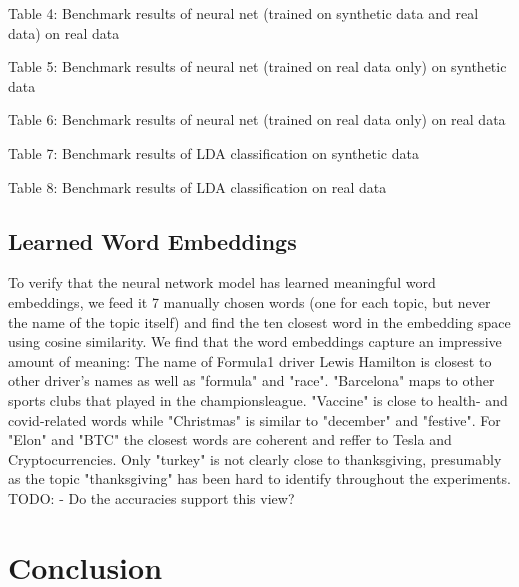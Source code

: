 \documentclass[11pt]{article}
\begin{document}
\begin{center}

\end{center}
Table 4: Benchmark results of neural net (trained on synthetic data and real data) on real data

\begin{center}

\end{center}
Table 5: Benchmark results of neural net (trained on real data only) on synthetic data


\begin{center}

\end{center}
Table 6: Benchmark results of neural net (trained on real data only) on real data


\begin{center}

\end{center}
Table 7: Benchmark results of LDA classification on synthetic data

\begin{center}

\end{center}
Table 8: Benchmark results of LDA classification on real data


\subsection{Learned Word Embeddings}
To verify that the neural network model has learned meaningful word embeddings, we feed it 7 manually chosen words (one for each topic, but never the name of the topic itself) and find the ten closest word in the embedding space using cosine similarity. We find that the word embeddings capture an impressive amount of meaning: The name of Formula1 driver Lewis Hamilton is closest to other driver's names as well as "formula" and "race". "Barcelona" maps to other sports clubs that played in the championsleague. "Vaccine" is close to health- and covid-related words while "Christmas" is similar to "december" and "festive". For "Elon" and "BTC" the closest words are coherent and reffer to Tesla and Cryptocurrencies. Only "turkey" is not clearly close to thanksgiving, presumably as the topic "thanksgiving" has been hard to identify throughout the experiments.
TODO:
- Do the accuracies support this view?


\begin{adjustbox}{width=\columnwidth,center}

\end{adjustbox}

\section{Conclusion}



\newpage
\printbibliography
\end{document}

